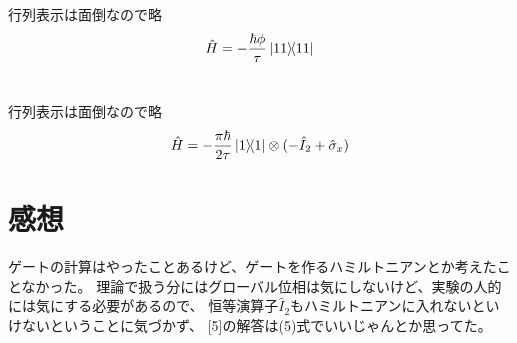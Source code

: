 \documentclass[../ap_2021.tex]{subfiles}
\begin{document}
\section{}
行列表示は面倒なので略
\begin{equation}\begin{aligned}[b]
    \hat{H}=-\frac{\hbar\phi}{\tau}\ketbra{11}
\end{aligned}\end{equation}

\section{}
行列表示は面倒なので略
\begin{equation}\begin{aligned}[b]
    \hat{H}=-\frac{\pi\hbar}{2\tau}\ketbra{1}\otimes(-\hat{I}_2+\hat{\sigma}_x)
\end{aligned}\end{equation}

\section*{感想}
ゲートの計算はやったことあるけど、ゲートを作るハミルトニアンとか考えたことなかった。
理論で扱う分にはグローバル位相は気にしないけど、実験の人的には気にする必要があるので、
恒等演算子\(\hat{I}_2\)もハミルトニアンに入れないといけないということに気づかず、
[5]の解答は(5)式でいいじゃんとか思ってた。
\end{document}
